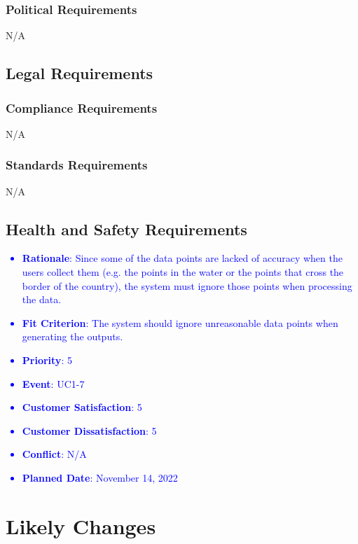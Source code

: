\documentclass[12pt, titlepage]{article}
\newcounter{reqnum} %
\newcounter{freqnum} %
\begin{document}
\begin{itemize}
\subsubsection{Political Requirements}
N/A
\subsection{Legal Requirements}

\subsubsection{Compliance Requirements}
N/A
\subsubsection{Standards Requirements}
N/A
\subsection{Health and Safety Requirements}
\textcolor{blue}{
\item[NFR\refstepcounter{freqnum}\thefreqnum
\label{NFR}:] 
\begin{itemize}
    \item \textbf{Rationale}: Since some of the data points are lacked of accuracy when the users collect them (e.g. the points in the water or the points that cross the border of the country), the system must ignore those points when processing the data.
    \item \textbf{Fit Criterion}: The system should ignore unreasonable data points when generating the outputs.
    \item \textbf{Priority}: 5
    \item \textbf{Event}: UC1-7%
    \item \textbf{Customer Satisfaction}: 5
    \item \textbf{Customer Dissatisfaction}: 5
    \item \textbf{Conflict}: N/A
    \item \textbf{Planned Date}: November 14, 2022
\end{itemize}
}

\end{itemize}
\section{Likely Changes}
\end{document}
